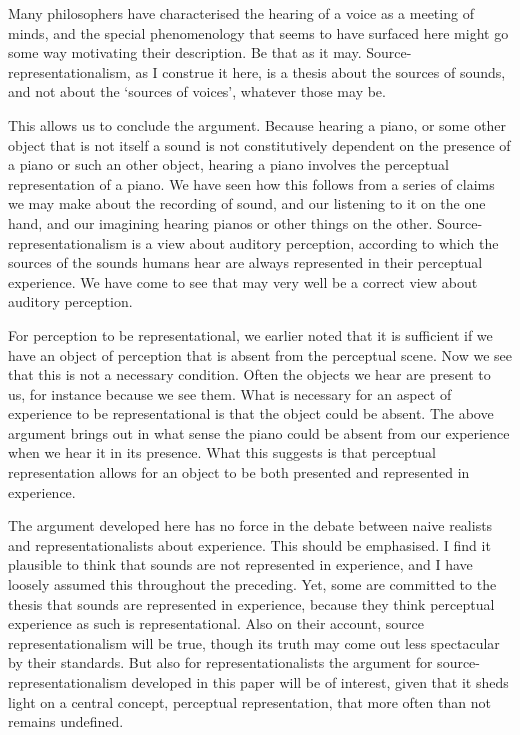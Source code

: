 \documentclass[sloppy, journal, git, bytitle, dodraft]{humapap}
\begin{document}
Many philosophers have characterised the hearing of a voice as a meeting of minds, and the special phenomenology that seems to have surfaced here might go some way motivating their description. Be that as it may. Source-representationalism, as I construe it here, is a thesis about the sources of sounds, and not about the `sources of voices', whatever those may be.


\sect This allows us to conclude the argument. Because hearing a piano, or some other object that is not itself a sound is not constitutively dependent on the presence of a piano or such an other object, hearing a piano involves the perceptual representation of a piano. We have seen how this follows from a series of claims we may make about the recording of sound, and our listening to it on the one hand, and our imagining hearing pianos or other things on the other. Source-representationalism is a view about auditory perception, according to which the sources of the sounds humans hear are always represented in their perceptual experience. We have come to see that may very well be a correct view about auditory perception.

For perception to be representational, we earlier noted that it is sufficient if we have an object of perception that is absent from the perceptual scene. Now we see that this is not a necessary condition. Often the objects we hear are present to us, for instance because we see them. What is necessary for an aspect of experience to be representational is that the object could be absent. The above argument brings out in what sense the piano could be absent from our experience when we hear it in its presence. What this suggests is that perceptual representation allows for an object to be both presented and represented in experience. 

The argument developed here has no force in the debate between naive realists and representationalists about experience. This should be emphasised. I find it plausible to think that sounds are not represented in experience, and I have loosely assumed this throughout the preceding. Yet, some are committed to the thesis that sounds are represented in experience, because they think perceptual experience as such is representational. Also on their account, source representationalism will be true, though its truth may come out less spectacular by their standards. But also for representationalists the argument for source-representationalism developed in this paper will be of interest, given that it sheds light on a central concept, perceptual representation, that more often than not remains undefined. 
\end{document}
